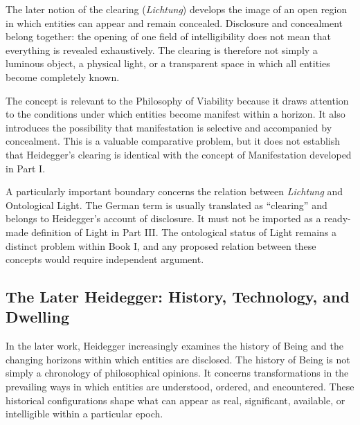 \label{para:VS.B01.P01.C08.S11.SS11.P002}

The later notion of the clearing
(\textit{Lichtung}) develops the image of an
open region in which entities can appear and
remain concealed. Disclosure and concealment
belong together: the opening of one field of
intelligibility does not mean that everything
is revealed exhaustively. The clearing is
therefore not simply a luminous object, a
physical light, or a transparent space in
which all entities become completely known.

\label{para:VS.B01.P01.C08.S11.SS11.P003}

The concept is relevant to the Philosophy of
Viability because it draws attention to the
conditions under which entities become
manifest within a horizon. It also introduces
the possibility that manifestation is selective
and accompanied by concealment. This is a
valuable comparative problem, but it does
not establish that Heidegger's clearing is
identical with the concept of Manifestation
developed in Part I.
\cite{WrathallHeideggerSEP2025}

\label{para:VS.B01.P01.C08.S11.SS11.P004}

A particularly important boundary concerns
the relation between \textit{Lichtung} and
Ontological Light. The German term is usually
translated as ``clearing'' and belongs to
Heidegger's account of disclosure. It must
not be imported as a ready-made definition
of Light in Part III. The ontological status
of Light remains a distinct problem within
Book I, and any proposed relation between
these concepts would require independent
argument.



\subsection{The Later Heidegger: History, Technology, and Dwelling}
\label{subsec:ch08-heidegger-later}

\label{para:VS.B01.P01.C08.S11.SS12.P001}

In the later work, Heidegger increasingly examines
the history of Being and the changing horizons
within which entities are disclosed. The history
of Being is not simply a chronology of philosophical
opinions. It concerns transformations in the
prevailing ways in which entities are understood,
ordered, and encountered. These historical
configurations shape what can appear as real,
significant, available, or intelligible within
a particular epoch.
\cite{WrathallHeideggerSEP2025}

